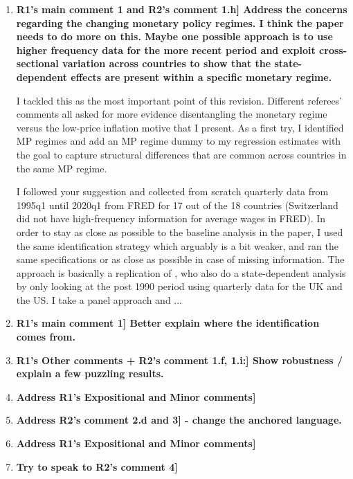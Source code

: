 \documentclass[12pt]{article}
\begin{document}
\begin{enumerate}
\item \textbf{\lbrack R1's main comment 1 and R2’s  comment 1.h] Address the concerns regarding the changing monetary policy regimes. I think the paper needs to do more on this. Maybe one possible approach is to use higher frequency data for the more recent period and exploit cross-sectional variation across countries to show that the state-dependent effects are present within a specific monetary regime.}

I tackled this as the most important point of this revision. Different referees' comments all asked for more evidence disentangling the monetary regime versus the low-price inflation motive that I present. As a first try, I identified MP regimes and add an MP regime dummy to my regression estimates with the goal to capture structural differences that are common across countries in the same MP regime. 

I followed your suggestion and collected from scratch quarterly data from 1995q1 until 2020q1 from FRED for 17 out of the 18 countries (Switzerland did not have high-frequency information for average wages in FRED). In order to stay as close as possible to the baseline analysis in the paper, I used the same identification strategy which arguably is a bit weaker, and ran the same specifications or as close as possible in case of missing information. The approach is basically a replication of \cite{Barnichon2019}, who also do a state-dependent analysis by only looking at the post 1990 period using quarterly data for the UK and the US. I take a panel approach and ...

\item \textbf{\lbrack R1's main comment 1] Better explain where the identification comes from.}



\item \textbf{\lbrack R1's Other comments + R2's comment 1.f, 1.i:] Show robustness / explain a few puzzling results.}


\item \textbf{\lbrack Address R1's Expositional and Minor comments]}

\item \textbf{\lbrack Address R2's comment 2.d and 3] - change the anchored language.}

\item \textbf{\lbrack Address R1's Expositional and Minor comments]}

\item \textbf{\lbrack Try to speak to R2's comment 4]}

\end{enumerate}
\end{document}
